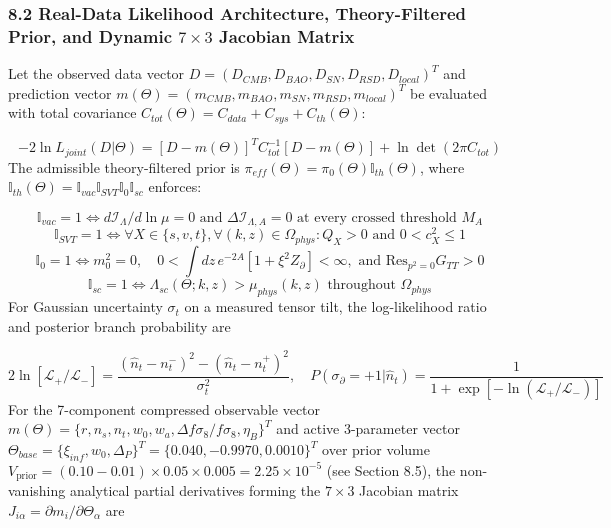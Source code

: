 \documentclass[aps,prd,onecolumn,superscriptaddress,nofootinbib,longbibliography,10pt]{revtex4-2}
\begin{document}
  
\subsubsection*{8.2 Real-Data Likelihood Architecture, Theory-Filtered Prior, and Dynamic \(7 \times 3\) Jacobian Matrix}

  Let the observed data vector \(D = (D_{CMB}, D_{BAO}, D_{SN}, D_{RSD}, D_{local})^T\) and prediction vector \(m(\Theta) = (m_{CMB}, m_{BAO}, m_{SN}, m_{RSD}, m_{local})^T\) be evaluated with total covariance \(C_{tot}(\Theta) = C_{data} + C_{sys} + C_{th}(\Theta)\):


  \[ -2\ln L_{joint}(D|\Theta) = [D - m(\Theta)]^T C_{tot}^{-1} [D - m(\Theta)] + \ln\det(2\pi C_{tot}) \]
  The admissible theory-filtered prior is \(\pi_{eff}(\Theta) = \pi_0(\Theta)\mathbb{I}_{th}(\Theta)\), where \(\mathbb{I}_{th}(\Theta) = \mathbb{I}_{vac}\mathbb{I}_{SVT}\mathbb{I}_0\mathbb{I}_{sc}\) enforces:


  \[ \mathbb{I}_{vac} = 1 \iff d\mathcal{I}_\Lambda/d\ln\mu = 0\text{ and }\Delta\mathcal{I}_{\Lambda,A} = 0\text{ at every crossed threshold }M_A \]
  \[ \mathbb{I}_{SVT} = 1 \iff \forall X \in \{s, v, t\}, \forall(k,z) \in \Omega_{phys} : Q_X > 0\text{ and }0 < c_X^2 \le 1 \]
  \[ \mathbb{I}_0 = 1 \iff m_0^2 = 0, \quad 0 < \int dz\,e^{-2A}[1 + \xi^2 Z_\partial] < \infty, \text{ and }\text{Res}_{p^2=0}G_{TT} > 0 \]
  \[ \mathbb{I}_{sc} = 1 \iff \Lambda_{sc}(\Theta; k, z) > \mu_{phys}(k,z)\text{ throughout }\Omega_{phys} \]
  For Gaussian uncertainty \(\sigma_t\) on a measured tensor tilt, the log-likelihood ratio and posterior branch probability are


  \[ 2\ln[\mathcal{L}_+/\mathcal{L}_-] = \frac{(\hat{n}_t - n_t^-)^2 - (\hat{n}_t - n_t^+)^2}{\sigma_t^2}, \quad P(\sigma_\partial = +1|\hat{n}_t) = \frac{1}{1 + \exp[-\ln(\mathcal{L}_+/\mathcal{L}_-)]} \]
  For the 7-component compressed observable vector \(m(\Theta) = \{r, n_s, n_t, w_0, w_a, \Delta f\sigma_8/f\sigma_8, \eta_B\}^T\) and active 3-parameter vector \(\Theta_{base} = \{\xi_{inf}, w_0, \Delta_P\}^T = \{0.040, -0.9970, 0.0010\}^T\) over prior volume \(V_{\text{prior}} = (0.10 - 0.01) \times 0.05 \times 0.005 = 2.25 \times 10^{-5}\) (see Section 8.5), the non-vanishing analytical partial derivatives forming the \(7 \times 3\) Jacobian matrix \(J_{i\alpha} = \partial m_i/\partial\Theta_\alpha\) are
\end{document}
